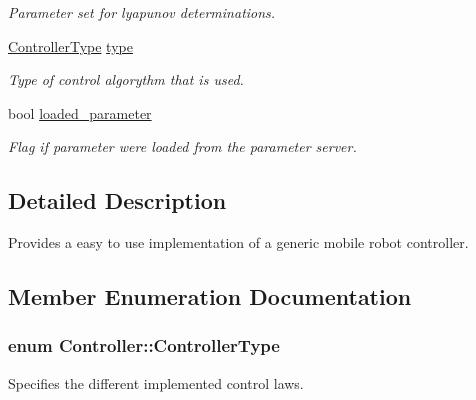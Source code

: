 \begin{DoxyCompactItemize}
\begin{DoxyCompactList}\small\item\em Parameter set for lyapunov determinations. \end{DoxyCompactList}\item 
\hyperlink{classController_aa6d956c4c220461a4152415ffa78690a}{Controller\+Type} \hyperlink{classController_a17792cff397dc69baca568c7d03f2fc8}{type}\hypertarget{classController_a17792cff397dc69baca568c7d03f2fc8}{}\label{classController_a17792cff397dc69baca568c7d03f2fc8}

\begin{DoxyCompactList}\small\item\em Type of control algorythm that is used. \end{DoxyCompactList}\item 
bool \hyperlink{classController_a4e0e569456498e5670a48244c22cafc9}{loaded\+\_\+parameter}\hypertarget{classController_a4e0e569456498e5670a48244c22cafc9}{}\label{classController_a4e0e569456498e5670a48244c22cafc9}

\begin{DoxyCompactList}\small\item\em Flag if parameter were loaded from the parameter server. \end{DoxyCompactList}\end{DoxyCompactItemize}


\subsection{Detailed Description}
Provides a easy to use implementation of a generic mobile robot controller. 

\subsection{Member Enumeration Documentation}
\subsubsection[{\texorpdfstring{Controller\+Type}{ControllerType}}]{\setlength{\rightskip}{0pt plus 5cm}enum {\bf Controller\+::\+Controller\+Type}}\hypertarget{classController_aa6d956c4c220461a4152415ffa78690a}{}\label{classController_aa6d956c4c220461a4152415ffa78690a}


Specifies the different implemented control laws. 

